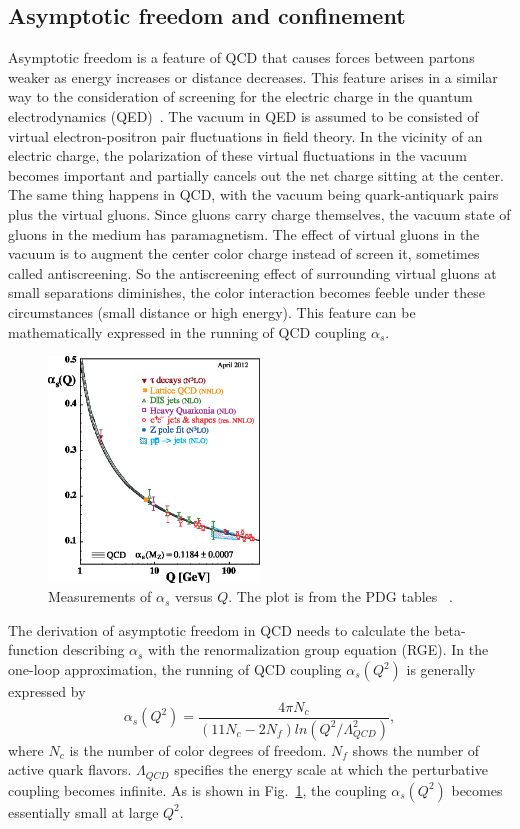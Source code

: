 \subsection{Asymptotic freedom and confinement}
Asymptotic freedom is a feature of QCD that causes forces between partons weaker
as energy increases or distance decreases. This feature arises in a similar way
to the consideration of screening for the electric charge in the quantum
electrodynamics (QED)~\cite{Feynman:1950ir, Gockeler:1997dn}. The vacuum in QED
is assumed to be consisted of virtual electron-positron pair fluctuations in
field theory. In the vicinity of an electric charge, the polarization of these
virtual fluctuations in the vacuum becomes important and partially cancels out
the net charge sitting at the center. The same thing happens in QCD, with the
vacuum being quark-antiquark pairs plus the virtual gluons. Since gluons carry
charge themselves, the vacuum state of gluons in the medium has paramagnetism.
The effect of virtual gluons in the vacuum is to augment the center color charge
instead of screen it, sometimes called antiscreening. So the antiscreening
effect of surrounding virtual gluons at small separations diminishes, the color
interaction becomes feeble under these circumstances (small distance or high
energy). This feature can be mathematically expressed in the running of QCD
coupling $\alpha_{s}$.

\begin{figure}
\centering
\includegraphics[width=0.5\textwidth]{plots/chpt2/asq.eps}
\caption[Measurement of $\alpha_{s}$] {
Measurements of $\alpha_s$ versus $Q$. The plot is from the PDG tables ~\cite{Beringer:1900zz}.}
\label{fig:alpha_s}
\end{figure}

The derivation of asymptotic freedom in QCD needs to calculate the beta-function
describing $\alpha_{s}$ with the renormalization group equation (RGE). In the
one-loop approximation, the running of QCD coupling $\alpha_{s}(Q^{2})$ is
generally expressed by~\cite{Collins:1987pm}
\begin{equation}
\alpha_{s}(Q^{2})=\frac{4\pi N_{c}}{(11N_{c}-2N_{f})ln(Q^{2}/\Lambda^{2}_{QCD})},
\label{eqn:alphas}
\end{equation}
where $N_{c}$ is the number of color degrees of freedom. $N_{f}$ shows the
number of active quark flavors. $\Lambda_{QCD}$ specifies the energy scale at
which the perturbative coupling becomes infinite. As is shown in
Fig.~\ref{fig:alpha_s}, the coupling $\alpha_{s}(Q^{2})$ becomes essentially
small at large $Q^{2}$.

